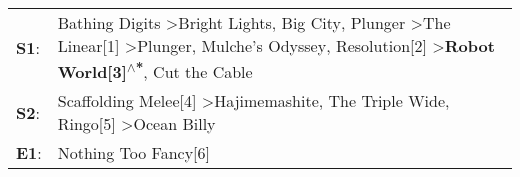 \begin{supertabular}{p{0.03\textwidth}p{0.92\textwidth}}
 \textbf{S1}:  &  Bathing Digits\textsuperscript{} \textgreater \enspace Bright Lights, Big City\textsuperscript{}, \enspace Plunger\textsuperscript{} \textgreater \enspace The Linear[1]\textsuperscript{} \textgreater \enspace Plunger\textsuperscript{}, \enspace Mulche's Odyssey\textsuperscript{}, \enspace Resolution[2]\textsuperscript{} \textgreater \enspace \textbf{Robot World[3]\textsuperscript{$\wedge$*}}, \enspace Cut the Cable\textsuperscript{}  \enspace  \\
 \textbf{S2}:  &                                                                                                                                                                                                                     Scaffolding Melee[4]\textsuperscript{} \textgreater \enspace Hajimemashite\textsuperscript{}, \enspace The Triple Wide\textsuperscript{}, \enspace Ringo[5]\textsuperscript{} \textgreater \enspace Ocean Billy\textsuperscript{}  \enspace  \\
 \textbf{E1}:  &                                                                                                                                                                                                                                                                                                                                                                                                                Nothing Too Fancy[6]\textsuperscript{}  \enspace  \\
\end{supertabular}
